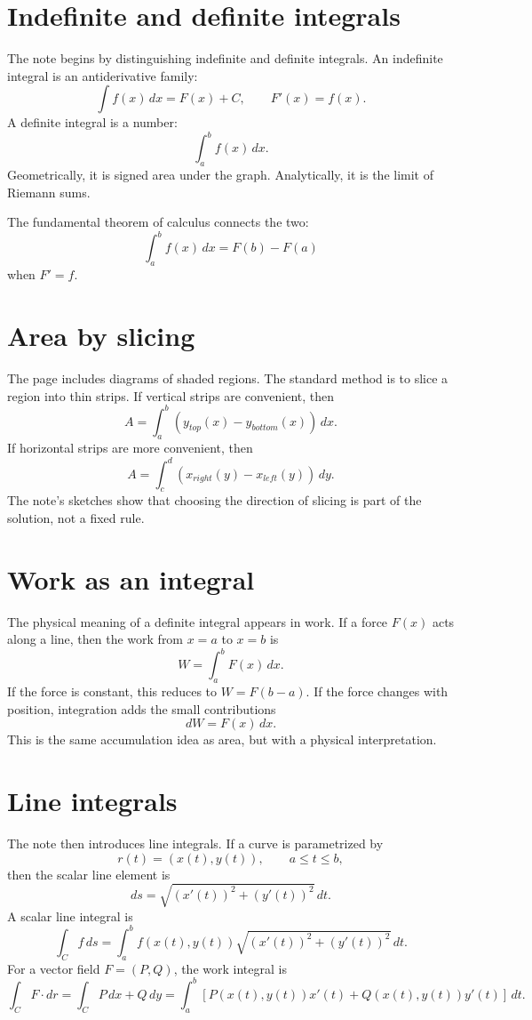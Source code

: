 
\section{Indefinite and definite integrals}

The note begins by distinguishing indefinite and definite integrals.  An indefinite integral is an antiderivative family:
\[
  \int f(x)\,dx=F(x)+C,\qquad F'(x)=f(x).
\]
A definite integral is a number:
\[
  \int_a^b f(x)\,dx.
\]
Geometrically, it is signed area under the graph.  Analytically, it is the limit of Riemann sums.

The fundamental theorem of calculus connects the two:
\[
  \int_a^b f(x)\,dx=F(b)-F(a)
\]
when $F'=f$.

\section{Area by slicing}

The page includes diagrams of shaded regions.  The standard method is to slice a region into thin strips.  If vertical strips are convenient, then
\[
  A=\int_a^b (y_{top}(x)-y_{bottom}(x))\,dx.
\]
If horizontal strips are more convenient, then
\[
  A=\int_c^d (x_{right}(y)-x_{left}(y))\,dy.
\]
The note's sketches show that choosing the direction of slicing is part of the solution, not a fixed rule.

\section{Work as an integral}

The physical meaning of a definite integral appears in work.  If a force $F(x)$ acts along a line, then the work from $x=a$ to $x=b$ is
\[
  W=\int_a^b F(x)\,dx.
\]
If the force is constant, this reduces to $W=F(b-a)$.  If the force changes with position, integration adds the small contributions
\[
  dW=F(x)\,dx.
\]
This is the same accumulation idea as area, but with a physical interpretation.

\section{Line integrals}

The note then introduces line integrals.  If a curve is parametrized by
\[
  r(t)=(x(t),y(t)),\qquad a\le t\le b,
\]
then the scalar line element is
\[
  ds=\sqrt{(x'(t))^2+(y'(t))^2}\,dt.
\]
A scalar line integral is
\[
  \int_C f\,ds
  =\int_a^b f(x(t),y(t))\sqrt{(x'(t))^2+(y'(t))^2}\,dt.
\]
For a vector field $F=(P,Q)$, the work integral is
\[
  \int_C F\cdot dr
  =\int_C P\,dx+Q\,dy
  =\int_a^b [P(x(t),y(t))x'(t)+Q(x(t),y(t))y'(t)]\,dt.
\]


